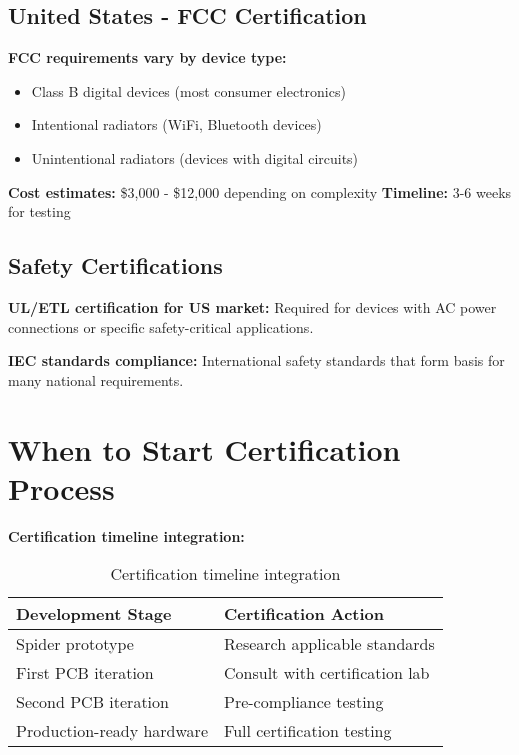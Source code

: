 \subsection{United States - FCC Certification}

\textbf{FCC requirements vary by device type:}
\begin{itemize}
\item Class B digital devices (most consumer electronics)
\item Intentional radiators (WiFi, Bluetooth devices)
\item Unintentional radiators (devices with digital circuits)
\end{itemize}

\textbf{Cost estimates:} \$3,000 - \$12,000 depending on complexity
\textbf{Timeline:} 3-6 weeks for testing

\subsection{Safety Certifications}

\textbf{UL/ETL certification for US market:}
Required for devices with AC power connections or specific safety-critical applications.

\textbf{IEC standards compliance:}
International safety standards that form basis for many national requirements.

\section{When to Start Certification Process}

\textbf{Certification timeline integration:}

\begin{table}[h]
\centering
\begin{tabular}{|l|l|}
\hline
\textbf{Development Stage} & \textbf{Certification Action} \\
\hline
Spider prototype & Research applicable standards \\
First PCB iteration & Consult with certification lab \\
Second PCB iteration & Pre-compliance testing \\
Production-ready hardware & Full certification testing \\
\hline
\end{tabular}
\caption{Certification timeline integration}
\end{table}

